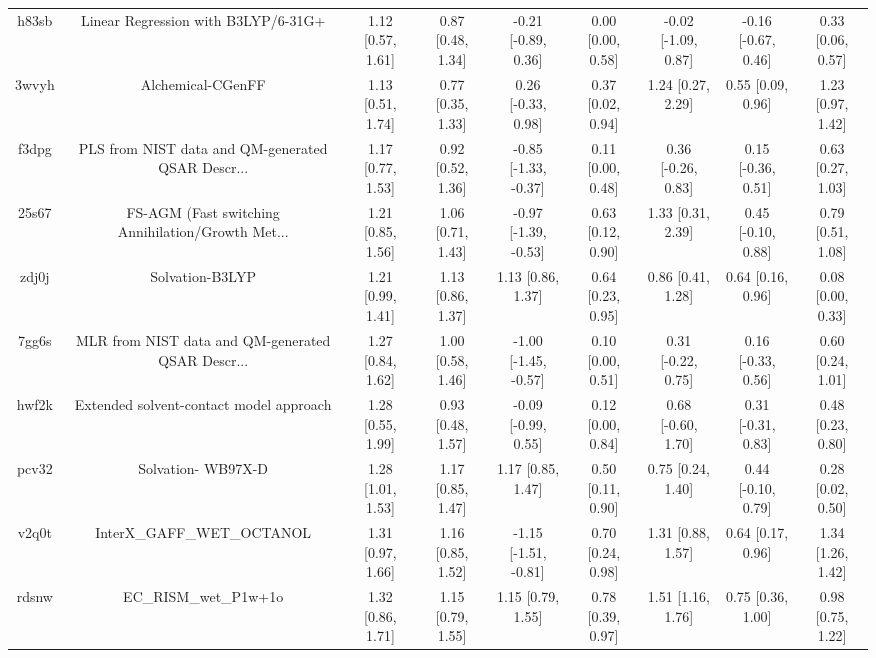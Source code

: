 \documentclass{article}
\begin{document}
\begin{center}
\begin{longtable}{|ccccccccc|}
 h83sb &                Linear Regression with B3LYP/6-31G+ &  1.12 [0.57, 1.61] &  0.87 [0.48, 1.34] &   -0.21 [-0.89, 0.36] &  0.00 [0.00, 0.58] &  -0.02 [-1.09, 0.87] &  -0.16 [-0.67, 0.46] &     0.33 [0.06, 0.57] \\
 3wvyh &                                  Alchemical-CGenFF &  1.13 [0.51, 1.74] &  0.77 [0.35, 1.33] &    0.26 [-0.33, 0.98] &  0.37 [0.02, 0.94] &    1.24 [0.27, 2.29] &    0.55 [0.09, 0.96] &     1.23 [0.97, 1.42] \\
 f3dpg &  PLS from NIST data and QM-generated QSAR Descr... &  1.17 [0.77, 1.53] &  0.92 [0.52, 1.36] &  -0.85 [-1.33, -0.37] &  0.11 [0.00, 0.48] &   0.36 [-0.26, 0.83] &   0.15 [-0.36, 0.51] &     0.63 [0.27, 1.03] \\
 25s67 &  FS-AGM (Fast switching Annihilation/Growth Met... &  1.21 [0.85, 1.56] &  1.06 [0.71, 1.43] &  -0.97 [-1.39, -0.53] &  0.63 [0.12, 0.90] &    1.33 [0.31, 2.39] &   0.45 [-0.10, 0.88] &     0.79 [0.51, 1.08] \\
 zdj0j &                                    Solvation-B3LYP &  1.21 [0.99, 1.41] &  1.13 [0.86, 1.37] &     1.13 [0.86, 1.37] &  0.64 [0.23, 0.95] &    0.86 [0.41, 1.28] &    0.64 [0.16, 0.96] &     0.08 [0.00, 0.33] \\
 7gg6s &  MLR from NIST data and QM-generated QSAR Descr... &  1.27 [0.84, 1.62] &  1.00 [0.58, 1.46] &  -1.00 [-1.45, -0.57] &  0.10 [0.00, 0.51] &   0.31 [-0.22, 0.75] &   0.16 [-0.33, 0.56] &     0.60 [0.24, 1.01] \\
 hwf2k &            Extended solvent-contact model approach &  1.28 [0.55, 1.99] &  0.93 [0.48, 1.57] &   -0.09 [-0.99, 0.55] &  0.12 [0.00, 0.84] &   0.68 [-0.60, 1.70] &   0.31 [-0.31, 0.83] &     0.48 [0.23, 0.80] \\
 pcv32 &                                 Solvation- WB97X-D &  1.28 [1.01, 1.53] &  1.17 [0.85, 1.47] &     1.17 [0.85, 1.47] &  0.50 [0.11, 0.90] &    0.75 [0.24, 1.40] &   0.44 [-0.10, 0.79] &     0.28 [0.02, 0.50] \\
 v2q0t &                         InterX\_GAFF\_WET\_OCTANOL &  1.31 [0.97, 1.66] &  1.16 [0.85, 1.52] &  -1.15 [-1.51, -0.81] &  0.70 [0.24, 0.98] &    1.31 [0.88, 1.57] &    0.64 [0.17, 0.96] &     1.34 [1.26, 1.42] \\
 rdsnw &                              EC\_RISM\_wet\_P1w+1o &  1.32 [0.86, 1.71] &  1.15 [0.79, 1.55] &     1.15 [0.79, 1.55] &  0.78 [0.39, 0.97] &    1.51 [1.16, 1.76] &    0.75 [0.36, 1.00] &     0.98 [0.75, 1.22] \\

\end{longtable}
\end{center}
\end{document}

